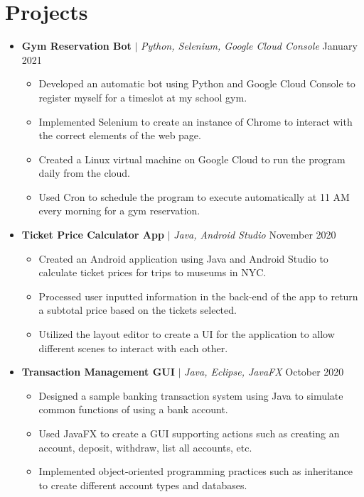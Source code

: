 \documentclass[letterpaper,5pt]{article}
\begin{document}
    
    \section{Projects}
    \begin{itemize}[leftmargin=0in, label={}]
        \item[]
            \textbf{Gym Reservation Bot} $|$ \emph{Python, Selenium, Google Cloud Console} \hfill January 2021
            \begin{itemize}
                \item[\textbullet] Developed an automatic bot using Python and Google Cloud Console to register myself for a timeslot at my school gym.
                \item[\textbullet] Implemented Selenium to create an instance of Chrome to interact with the correct elements of the web page.
                \item[\textbullet] Created a Linux virtual machine on Google Cloud to run the program daily from the cloud.
                \item[\textbullet] Used Cron to schedule the program to execute automatically at 11 AM every morning for a gym reservation.
            \end{itemize}
            \vspace{-13pt}
        \item[]
            \textbf{Ticket Price Calculator App} $|$ \emph{Java, Android Studio} \hfill November 2020
            \begin{itemize}
                \item[\textbullet] Created an Android application using Java and Android Studio to calculate ticket prices for trips to museums in NYC.
                \item[\textbullet] Processed user inputted information in the back-end of the app to return a subtotal price based on the tickets selected.
                \item[\textbullet] Utilized the layout editor to create a UI for the application to allow different scenes to interact with each other.
            \end{itemize}
            \vspace{-13pt}
        \item[]
            \textbf{Transaction Management GUI} $|$ \emph{Java, Eclipse, JavaFX} \hfill October 2020
            \begin{itemize}
                \item[\textbullet] Designed a sample banking transaction system using Java to simulate common functions of using a bank account.
                \item[\textbullet] Used JavaFX to create a GUI supporting actions such as creating an account, deposit, withdraw, list all accounts, etc.
                \item[\textbullet] Implemented object-oriented programming practices such as inheritance to create different account types and databases.
            \end{itemize}
    \end{itemize}
    \vspace{-15pt}
    
\end{document}
